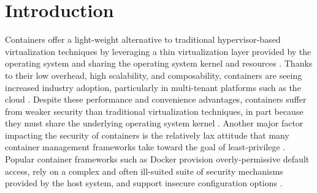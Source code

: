 \section{Introduction}

Containers offer a light-weight alternative to traditional hypervisor-based virtualization techniques by leveraging a thin virtualization layer provided by the operating system and sharing the operating system kernel and resources \cite{sultan2019_container_security,sun2018_security_namespace}. Thanks to their low overhead, high scalability, and composability, containers are seeing increased industry adoption, particularly in multi-tenant platforms such as the cloud . Despite these performance and convenience advantages, containers suffer from weaker security than traditional virtualization techniques, in part because they must share the underlying operating system kernel \cite{sultan2019_container_security,sun2018_security_namespace,xin2018_container_security}. Another major factor impacting the security of containers is the relatively lax attitude that many container management frameworks take toward the goal of least-privilege \cite{sultan2019_container_security}. Popular container frameworks such as Docker \cite{docker} provision overly-permissive default access, rely on a complex and often ill-suited suite of security mechanisms provided by the host system, and support insecure configuration options \cite{docker,sultan2019_container_security,xin2018_container_security,findlay2020_bpfbox}.



